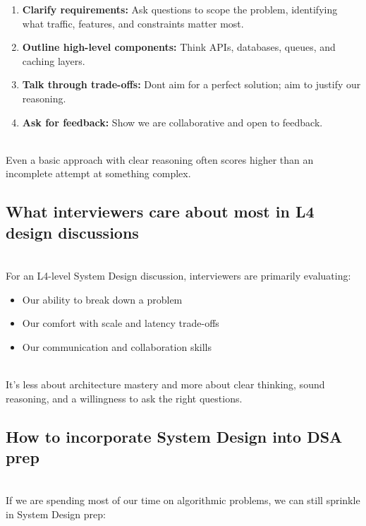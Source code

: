 \begin{enumerate}
\item
\protect{}\label{3dub93PDE44XX2cp2MIbW}
\textbf{Clarify requirements:} Ask questions to scope the problem, identifying what traffic, features, and constraints matter most.
\item
\protect{}\label{37qAGUVPk53saYRnSJWZG}
\textbf{Outline high-level components:} Think APIs, databases, queues, and caching layers.
\item
\protect{}\label{UgKxlstJ6Z38ZEuWIoeSk}
\textbf{Talk through trade-offs:} Don\textquotesingle t aim for a perfect solution; aim to justify our reasoning.
\item
\protect{}\label{KF-Rkp9vuzUK5pkKmIOkI}
\textbf{Ask for feedback:} Show we are collaborative and open to feedback.
\end{enumerate}
\\
Even a basic approach with clear reasoning often scores higher than an incomplete attempt at something complex.

\subsection{What interviewers care about most in L4 design discussions}\label{9CtF-_a2UAVbh0gJ_Q-6-}
\\
For an L4-level System Design discussion, interviewers are primarily evaluating:

\begin{itemize}
\item
\protect{}\label{bsfW1dM43oftiP77ppT9S}
Our ability to break down a problem
\item
\protect{}\label{PHdOolxIZOEHp61l0wCuU}
Our comfort with scale and latency trade-offs
\item
\protect{}\label{6i11B3mi5YriHjv0t6S2z}
Our communication and collaboration skills
\end{itemize}
\\
It's less about architecture mastery and more about clear thinking, sound reasoning, and a willingness to ask the right questions.

\subsection{How to incorporate System Design into DSA prep}\label{ohD7JrkJSlkelVL4KcvhH}
\\
If we are spending most of our time on algorithmic problems, we can still sprinkle in System Design prep:

